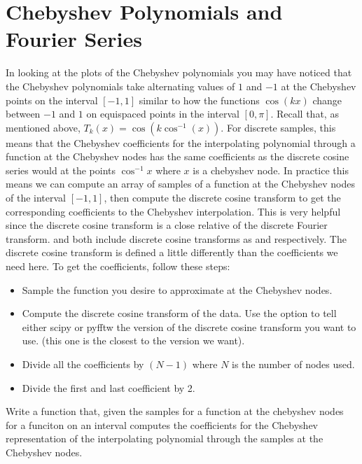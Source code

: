 \section*{Chebyshev Polynomials and Fourier Series}
In looking at the plots of the Chebyshev polynomials you may have noticed that the Chebyshev polynomials take alternating values of $1$ and $-1$ at the Chebyshev points on the interval $[-1,1]$ similar to how the functions $\cos\left(k x \right)$ change between $-1$ and $1$ on equispaced points in the interval $[ 0 , \pi ]$.
Recall that, as mentioned above, $T_k \left( x \right) = \cos \left( k \cos^{-1} \left( x \right) \right)$.
For discrete samples, this means that the Chebyshev coefficients for the interpolating polynomial through a function at the Chebyshev nodes has the same coefficients as the discrete cosine series would at the points $\cos^{-1} x$ where $x$ is a chebyshev node.
In practice this means we can compute an array of samples of a function at the Chebyshev nodes of the interval $[-1, 1]$, then compute the discrete cosine transform to get the corresponding coefficients to the Chebyshev interpolation.
This is very helpful since the discrete cosine transform is a close relative of the discrete Fourier transform.
 and  both include discrete cosine transforms as  and  respectively.
The discrete cosine transform is defined a little differently than the coefficients we need here.
To get the coefficients, follow these steps:

\begin{itemize}

\item Sample the function you desire to approximate at the Chebyshev nodes.

\item Compute the discrete cosine transform of the data.
Use the option  to tell either scipy or pyfftw the version of the discrete cosine transform you want to use. (this one is the closest to the version we want).

\item Divide all the coefficients by $\left( N - 1 \right)$ where $N$ is the number of nodes used.

\item Divide the first and last coefficient by 2.

\end{itemize}

\begin{problem}
Write a function that, given the samples for a function at the chebyshev nodes for a funciton on an interval computes the coefficients for the Chebyshev representation of the interpolating polynomial through the samples at the Chebyshev nodes.
\end{problem}

